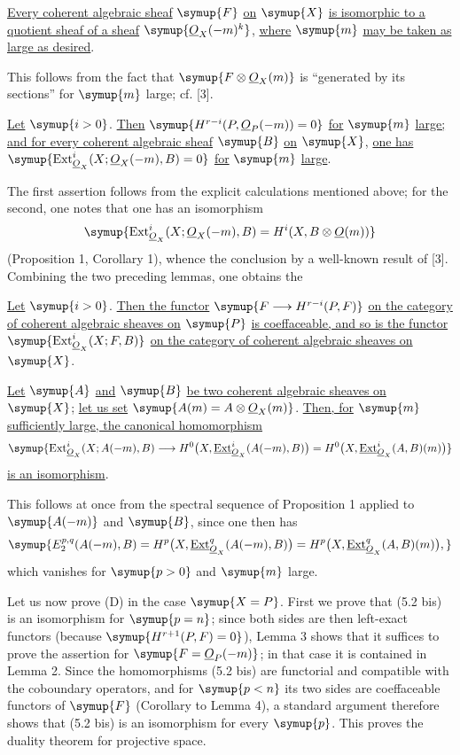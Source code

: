  \uline{Every coherent algebraic sheaf} $\symup{F}$ \uline{on} $\symup{X}$ \uline{is isomorphic to a
quotient sheaf of a sheaf} $\symup{\Osh_X(-m)^{k}}$, \uline{where} $\symup{m}$ \uline{may be taken as large as
desired}.

This follows from the fact that $\symup{F\otimes\Osh_X(m)}$ is ``generated by its
sections'' for $\symup{m}$ large; cf. [3].

 \uline{Let} $\symup{i>0}$. \uline{Then}
$\symup{H^{r-i}(P,\Osh_P(-m))=0}$ \uline{for} $\symup{m}$ \uline{large; and for every coherent algebraic sheaf}
$\symup{B}$ \uline{on} $\symup{X}$, \uline{one has}
$\symup{\operatorname{Ext}_{\Osh_X}^{i}(X;\Osh_X(-m),B)=0}$
\uline{for} $\symup{m}$ \uline{large}.

The first assertion follows from the explicit calculations mentioned above;
for the second, one notes that one has an isomorphism
\[
  \symup{\operatorname{Ext}_{\Osh_X}^{i}(X;\Osh_X(-m),B)
  =H^{i}(X,B\otimes\Osh(m))}
\]
(Proposition 1, Corollary 1), whence the conclusion by a well-known result of
[3]. Combining the two preceding lemmas, one obtains the

 \uline{Let} $\symup{i>0}$. \uline{Then the functor}
$\symup{F\longrightarrow H^{r-i}(P,F)}$ \uline{on the category of coherent algebraic sheaves on}
$\symup{P}$ \uline{is coeffaceable, and so is the functor}
$\symup{\operatorname{Ext}_{\Osh_X}^{i}(X;F,B)}$ \uline{on the category of coherent algebraic
sheaves on} $\symup{X}$.

 \uline{Let} $\symup{A}$ \uline{and} $\symup{B}$ \uline{be two coherent algebraic sheaves on} $\symup{X}$; \uline{let us
set} $\symup{A(m)=A\otimes\Osh_X(m)}$. \uline{Then, for} $\symup{m}$ \uline{sufficiently large, the canonical
homomorphism}
\[
  \symup{\operatorname{Ext}_{\Osh_X}^{i}(X;A(-m),B)
  \longrightarrow H^{0}\bigl(X,\Extsh_{\Osh_X}^{i}(A(-m),B)\bigr)
  =H^{0}\bigl(X,\Extsh_{\Osh_X}^{i}(A,B)(m)\bigr)}
\]
\uline{is an isomorphism}.

This follows at once from the spectral sequence of Proposition 1 applied to
$\symup{A(-m)}$ and $\symup{B}$, since one then has
\[
  \symup{E_{2}^{p,q}(A(-m),B)
  =H^{p}\bigl(X,\Extsh_{\Osh_X}^{q}(A(-m),B)\bigr)
  =H^{p}\bigl(X,\Extsh_{\Osh_X}^{q}(A,B)(m)\bigr),}
\]
which vanishes for $\symup{p>0}$ and $\symup{m}$ large.

Let us now prove (D) in the case $\symup{X=P}$. First we prove that (5.2 bis) is an
isomorphism for $\symup{p=n}$; since both sides are then left-exact functors (because
$\symup{H^{r+1}(P,F)=0}$), Lemma 3 shows that it suffices to prove the assertion for
$\symup{F=\Osh_P(-m)}$; in that case it is contained in Lemma 2. Since the homomorphisms
(5.2 bis) are functorial and compatible with the coboundary operators, and
for $\symup{p<n}$ its two sides are coeffaceable functors of $\symup{F}$ (Corollary to Lemma 4),
a standard argument therefore shows that (5.2 bis) is an isomorphism for every
$\symup{p}$. This proves the duality theorem for projective space.

